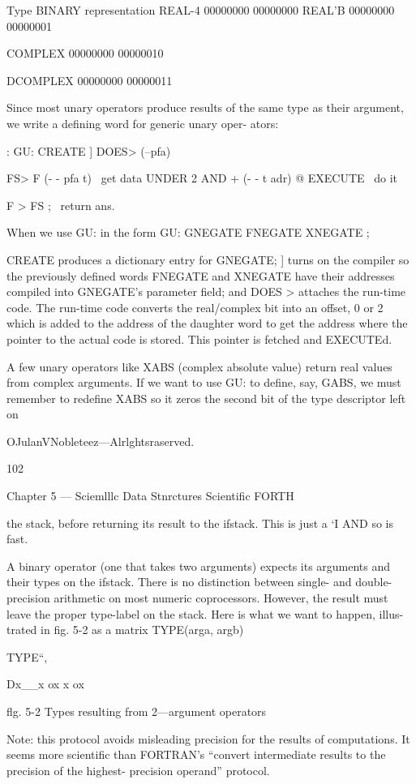 Type BINARY representation
REAL-4 00000000 00000000
REAL'B 00000000 00000001

COMPLEX 00000000 00000010

DCOMPLEX 00000000 00000011

Since most unary operators produce results of the same type as
their argument, we write a defining word for generic unary oper-
ators:

: GU: CREATE ] DOES> (--pfa)

FS> F (- - pfa t) \ get data
UNDER 2 AND + (- - t adr)
@ EXECUTE \ do it

F > FS ; \ return ans.

When we use GU: in the form
GU: GNEGATE FNEGATE XNEGATE ;

CREATE produces a dictionary entry for GNEGATE; ] turns on
the compiler so the previously defined words FNEGATE and
XNEGATE have their addresses compiled into GNEGATE’s
parameter field; and DOES > attaches the run-time code. The
run-time code converts the real/complex bit into an offset, 0 or 2
which is added to the address of the daughter word to get the
address where the pointer to the actual code is stored. This
pointer is fetched and EXECUTEd.

A few unary operators like XABS (complex absolute value)
return real values from complex arguments. If we want to use
GU: to define, say, GABS, we must remember to redefine
XABS so it zeros the second bit of the type descriptor left on

OJulanVNobleteez—Alrlghtsraserved.

102

Chapter 5 — Sciemlllc Data Stnrctures Scientific FORTH

the stack, before returning its result to the ifstack. This is just a ‘I
AND so is fast.

A binary operator (one that takes two arguments) expects its
arguments and their types on the ifstack. There is no distinction
between single- and double-precision arithmetic on most
numeric coprocessors. However, the result must leave the proper
type-label on the stack. Here is what we want to happen, illus-
trated in fig. 5-2 as a matrix TYPE(arga, argb)

TYPE“,

Dx__x ox x ox

flg. 5-2 Types resulting from 2—argument operators

Note: this protocol avoids misleading precision for the results
of computations. It seems more scientific than FORTRAN’s
“convert intermediate results to the precision of the highest-
precision operand” protocol.

